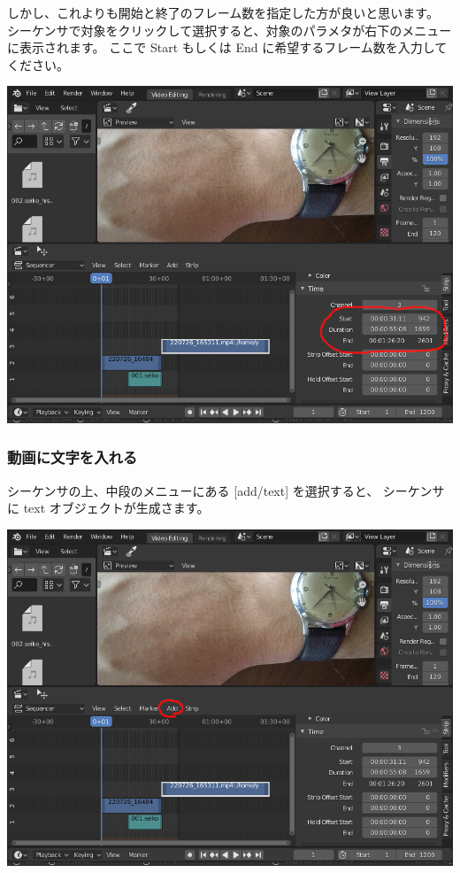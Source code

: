 \documentclass[mingoth,a4paper]{jsarticle}
\begin{document}
しかし、これよりも開始と終了のフレーム数を指定した方が良いと思います。
シーケンサで対象をクリックして選択すると、対象のパラメタが右下のメニューに表示されます。
ここで Start もしくは End に希望するフレーム数を入力してください。

\begin{center}
\includegraphics[scale=0.3]{image202209/blender_change_time_frame.png}
\end{center}

\subsubsection{動画に文字を入れる}

シーケンサの上、中段のメニューにある [add/text] を選択すると、
シーケンサに text オブジェクトが生成さます。

\begin{center}
\includegraphics[scale=0.3]{image202209/blender_add_text.png }
\end{center}
\end{document}
